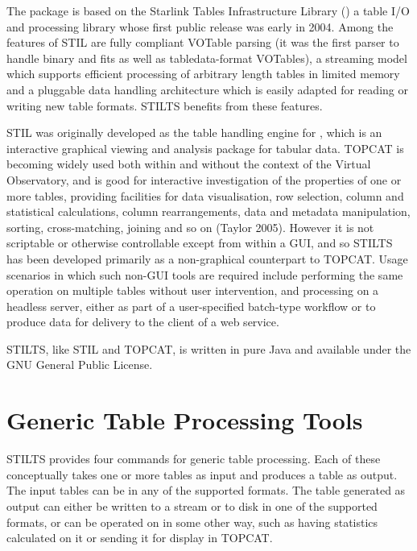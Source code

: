 \documentclass[11pt,twoside]{article}  %
\begin{document}
The package is based on the Starlink Tables Infrastructure Library 
()
a table I/O and processing library whose first public release was
early in 2004.  Among the features of STIL are fully compliant 
VOTable parsing (it was the first parser to handle
{\sc binary} and {\sc fits} as well
as {\sc tabledata}-format VOTables),
a streaming model which supports efficient 
processing of arbitrary length tables
in limited memory
and a pluggable data handling architecture which is easily adapted for 
reading or writing new table formats.
STILTS benefits from these features.

STIL was originally developed as the table handling engine for
,
which is an interactive graphical viewing and analysis package
for tabular data.  TOPCAT is becoming widely used both within
and without the context of the Virtual Observatory, and is
good for interactive investigation of the properties of
one or more tables, providing facilities for data visualisation, 
row selection, column and statistical calculations, 
column rearrangements, data and metadata 
manipulation, sorting, cross-matching, joining and so on
(Taylor 2005).
However it is not scriptable or otherwise controllable except 
from within a GUI, and so STILTS has been developed primarily 
as a non-graphical counterpart to TOPCAT.  
Usage scenarios in which such non-GUI tools are required include
performing the same operation on multiple tables without user intervention,
and processing on a headless server, either as part of
a user-specified batch-type workflow or to produce data 
for delivery to the client of a web service.

STILTS, like STIL and TOPCAT, is written in pure Java and available
under the GNU General Public License.

\section{Generic Table Processing Tools}

STILTS provides four commands for generic table processing.
Each of these conceptually takes one or more tables as input and
produces a table as output.
The input tables can be in any of the supported formats.
The table generated as output can either be written
to a stream or to disk in one of the supported formats, or 
can be operated on in some other way, such as having statistics
calculated on it or sending it for display in TOPCAT.
\end{document}
